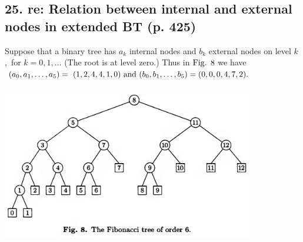 \documentclass[fontsize=11pt, paper=a4]{scrartcl}
\begin{document}
\subsection*{25. re: Relation between internal and external nodes in extended BT (p. 425)}\label{num: 25}
\parbox{\linewidth}{
    \qquad Suppose that a binary tree has $a_{k}$ internal nodes and $b_{k}$ external nodes on level $k$,\ 
    for $k=0,1,\dotsc$ (The root is at level zero.) Thus in $\text{Fig.\space} 8$ we have $(a_{0},a_{1},\dotsc,a_{5}) =\
    (1,2,4,4,1,0) \text{\space and\space} (b_{0}, b_{1}, \dotsc, b_{5}) = (0,0,0,4,7,2).$}
\begin{center}
 \includegraphics[height=7cm,width=11cm]{figure8.png}
\end{center}
\end{document}

